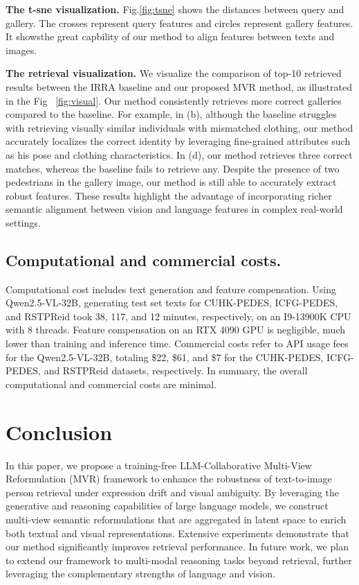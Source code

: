 \noindent\textbf{The t-sne visualization. } 
Fig.\ref{fig:tsne} shows the distances between query and gallery. The crosses represent query features and circles represent gallery features. It showsthe great capbility of our method to align features between texts and images.

\noindent\textbf{The retrieval visualization. } 
We visualize the comparison of top-10 retrieved results between the IRRA baseline and our proposed MVR method, as illustrated in the Fig ~\ref{fig:visual}. Our method consistently retrieves more correct galleries compared to the baseline. For example, in (b), although the baseline struggles with retrieving visually similar individuals with mismatched clothing, our method accurately localizes the correct identity by leveraging fine-grained attributes such as his pose and clothing characteristics. In (d), our method retrieves three correct matches, whereas the baseline fails to retrieve any. Despite the presence of two pedestrians in the gallery image, our method is still able to accurately extract robust features. These results highlight the advantage of incorporating richer semantic alignment between vision and language features in complex real-world settings.


\subsection{Computational and commercial costs.}

Computational cost includes text generation and feature compensation. Using Qwen2.5-VL-32B, generating test set texts for CUHK-PEDES, ICFG-PEDES, and RSTPReid took 38, 117, and 12 minutes, respectively, on an I9-13900K CPU with 8 threads. Feature compensation on an RTX 4090 GPU is negligible, much lower than training and inference time. Commercial costs refer to API usage fees for the Qwen2.5-VL-32B, totaling \$22, \$61, and \$7 for the CUHK-PEDES, ICFG-PEDES, and RSTPReid datasets, respectively. In summary, the overall computational and commercial costs are minimal.



\section{Conclusion}

In this paper, we propose a training-free LLM-Collaborative Multi-View Reformulation (MVR) framework to enhance the robustness of text-to-image person retrieval under expression drift and visual ambiguity. By leveraging the generative and reasoning capabilities of large language models, we construct multi-view semantic reformulations that are aggregated in latent space to enrich both textual and visual representations. Extensive experiments demonstrate that our method significantly improves retrieval performance. In future work, we plan to extend our framework to multi-modal reasoning tasks beyond retrieval, further leveraging the complementary strengths of language and vision.